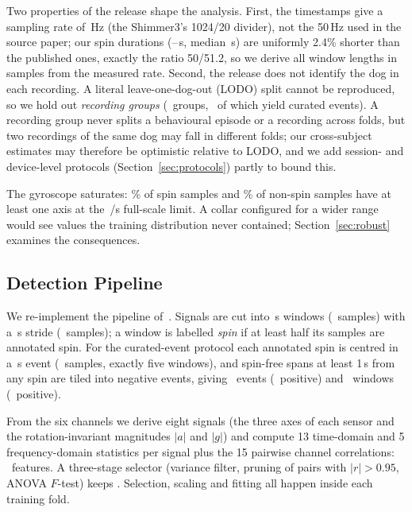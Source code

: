 Two properties of the release shape the analysis. First, the timestamps give a sampling rate of \,Hz (the Shimmer3's 1024/20 divider), not the 50\,Hz used in the source paper; our spin durations (--\,s, median \,s) are uniformly 2.4\% shorter than the published ones, exactly the ratio 50/51.2, so we derive all window lengths in samples from the measured rate. Second, the release does not identify the dog in each recording. A literal leave-one-dog-out (LODO) split cannot be reproduced, so we hold out \emph{recording groups} (~groups, ~of which yield curated events). A recording group never splits a behavioural episode or a recording across folds, but two recordings of the same dog may fall in different folds; our cross-subject estimates may therefore be optimistic relative to LODO, and we add session- and device-level protocols (Section~\ref{sec:protocols}) partly to bound this.

The gyroscope saturates: \% of spin samples and \% of non-spin samples have at least one axis at the \,\textdegree{}/s full-scale limit. A collar configured for a wider range would see values the training distribution never contained; Section~\ref{sec:robust} examines the consequences.

\subsection{Detection Pipeline}
\label{sec:pipeline}
We re-implement the pipeline of~\cite{brady2025collar}. Signals are cut into \,s windows (~samples) with a \,s stride (~samples); a window is labelled \emph{spin} if at least half its samples are annotated spin. For the curated-event protocol each annotated spin is centred in a \,s event (~samples, exactly five windows), and spin-free spans at least 1\,s from any spin are tiled into negative events, giving ~events (~positive) and ~windows (~positive).

From the six channels we derive eight signals (the three axes of each sensor and the rotation-invariant magnitudes $|a|$ and $|g|$) and compute 13 time-domain and 5 frequency-domain statistics per signal plus the 15 pairwise channel correlations: ~features. A three-stage selector (variance filter, pruning of pairs with $|r|>0.95$, ANOVA $F$-test) keeps . Selection, scaling and fitting all happen inside each training fold.

